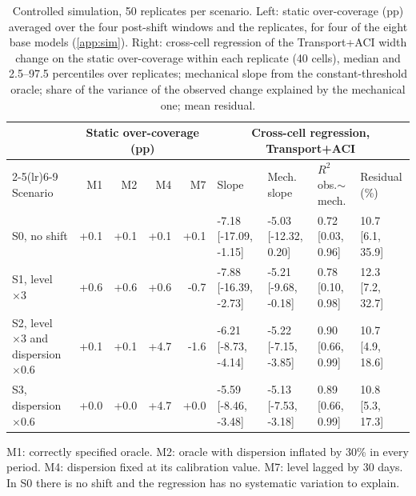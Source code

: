 \begin{table}[tp]
\centering
\footnotesize
\caption{Controlled simulation, 50 replicates per scenario. Left: static over-coverage (pp) averaged over the four post-shift windows and the replicates, for four of the eight base models (\ref{app:sim}). Right: cross-cell regression of the Transport+ACI width change on the static over-coverage within each replicate (40 cells), median and 2.5--97.5 percentiles over replicates; mechanical slope from the constant-threshold oracle; share of the variance of the observed change explained by the mechanical one; mean residual.}
\label{tab:simulacion}
\setlength{\tabcolsep}{3pt}
\scriptsize
\begin{tabular}{l rrrr llll}
\toprule
 & \multicolumn{4}{c}{Static over-coverage (pp)} & \multicolumn{4}{c}{Cross-cell regression, Transport+ACI} \\
\cmidrule(lr){2-5}\cmidrule(lr){6-9}
Scenario & M1 & M2 & M4 & M7 & Slope & Mech. slope & $R^2$ obs.$\sim$mech. & Residual (\%) \\
\midrule
S0, no shift & +0.1 & +0.1 & +0.1 & +0.1 & -7.18 [-17.09, -1.15] & -5.03 [-12.32, 0.20] & 0.72 [0.03, 0.96] & 10.7 [6.1, 35.9] \\
S1, level $\times 3$ & +0.6 & +0.6 & +0.6 & -0.7 & -7.88 [-16.39, -2.73] & -5.21 [-9.68, -0.18] & 0.78 [0.10, 0.98] & 12.3 [7.2, 32.7] \\
S2, level $\times 3$ and dispersion $\times 0.6$ & +0.1 & +0.1 & +4.7 & -1.6 & -6.21 [-8.73, -4.14] & -5.22 [-7.15, -3.85] & 0.90 [0.66, 0.99] & 10.7 [4.9, 18.6] \\
S3, dispersion $\times 0.6$ & +0.0 & +0.0 & +4.7 & +0.0 & -5.59 [-8.46, -3.48] & -5.13 [-7.53, -3.18] & 0.89 [0.66, 0.99] & 10.8 [5.3, 17.3] \\
\bottomrule
\end{tabular}

\smallskip\parbox{0.95\linewidth}{\scriptsize M1: correctly specified oracle. M2: oracle with dispersion inflated by 30\% in every period. M4: dispersion fixed at its calibration value. M7: level lagged by 30 days. In S0 there is no shift and the regression has no systematic variation to explain.}
\end{table}
